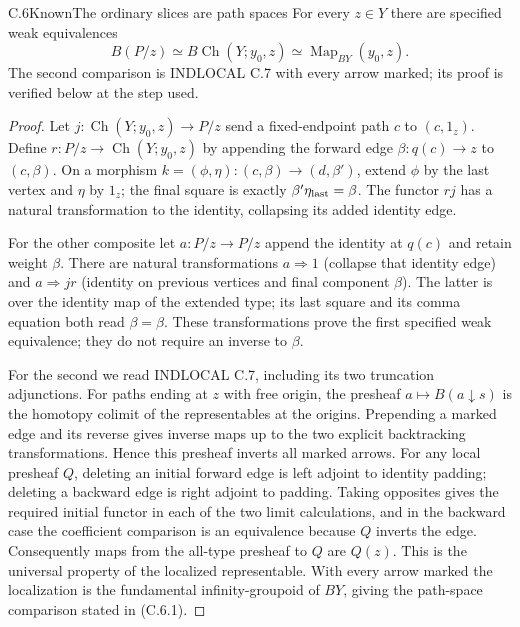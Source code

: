\begin{claim}{C.6}{Known}{The ordinary slices are path spaces}
\label{C:slice-path}
For every $z\in Y$ there are specified weak equivalences
\[
 B(P/z)\simeq B\operatorname{Ch}(Y;y_0,z)
       \simeq\operatorname{Map}_{BY}(y_0,z).
 \tag{C.6.1}
\]
The second comparison is INDLOCAL C.7 \cite{FINDLOCAL}
with every arrow marked;
its proof is verified below at the step used.
\end{claim}
\begin{proof}
Let $j:\operatorname{Ch}(Y;y_0,z)\to P/z$ send a fixed-endpoint
path $c$ to $(c,1_z)$. Define
$r:P/z\to\operatorname{Ch}(Y;y_0,z)$ by appending the forward
edge $\beta:q(c)\to z$ to $(c,\beta)$.
On a morphism $k=(\phi,\eta):(c,\beta)\to(d,\beta')$, extend
$\phi$ by the last vertex and $\eta$ by $1_z$; the final square
is exactly $\beta'\eta_{\rm last}=\beta$.
The functor $rj$ has a natural transformation to the identity,
collapsing its added identity edge.

For the other composite let $a:P/z\to P/z$ append the identity
at $q(c)$ and retain weight $\beta$. There are natural
transformations $a\Rightarrow1$ (collapse that identity edge)
and $a\Rightarrow jr$ (identity on previous vertices and final
component $\beta$). The latter is over the identity map of the
extended type; its last square and its comma equation both read
$\beta=\beta$. These transformations prove the first specified
weak equivalence; they do not require an inverse to $\beta$.

For the second we read INDLOCAL C.7, including its two truncation
adjunctions. For paths ending at $z$ with free origin, the presheaf
$a\mapsto B(a\downarrow s)$ is the homotopy colimit of the
representables at the origins. Prepending a marked edge and its
reverse gives inverse maps up to the two explicit backtracking
transformations. Hence this presheaf inverts all marked arrows.
For any local presheaf $Q$, deleting an initial forward edge is
left adjoint to identity padding; deleting a backward edge is
right adjoint to padding. Taking opposites gives the required
initial functor in each of the two limit calculations, and in
the backward case the coefficient comparison is an equivalence
because $Q$ inverts the edge. Consequently maps from the all-type
presheaf to $Q$ are $Q(z)$. This is the universal property of
the localized representable. With every arrow marked the
localization is the fundamental infinity-groupoid of $BY$, giving
the path-space comparison stated in (C.6.1).
\end{proof}

